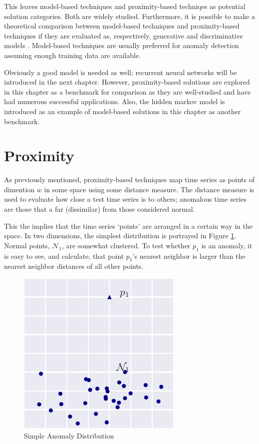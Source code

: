 This leaves model-based techniques and proximity-based techniqes as potential solution categories. Both are widely studied. Furthermore, it is possible to make a theoretical comparison between model-based techniques and proximity-based techniques if they are evaluated as, respectively, generative and discriminative models \cite{Ng2006}. Model-based techniques are usually preferred for anomaly detection \cite{Ngkvist2014} assuming enough training data are available.

Obviously a good model is needed as well; recurrent neural networks will be introduced in the next chapter. However, proximity-based solutions are explored in this chapter as a benchmark for comparison as they are well-studied and have had numerous successful applications. Also, the hidden markov model is introduced as an example of model-based solutions in this chapter as another benchmark.


\section{Proximity}
\label{sec:adproximity}

As previously mentioned, proximity-based techniques map time series as points of dimention $w$ in some space using some distance measure. The distance measure is used to evaluate how close a test time series is to others; anomalous time series are those that a far (dissimilar) from those considered normal.

This the implies that the time series `points' are arranged in a certain way in the space. In two dimensions, the simplest distribution is portrayed in Figure \ref{fig:simple_dist}. Normal points, $\mathcal{N}_1$, are somewhat clustered. To test whether $p_1$ is an anomaly, it is easy to see, and calculate, that point $p_1$'s nearest neighbor is larger than the nearest neighbor distances of all other points.

\begin{figure}[H]
  \centering
  \includegraphics{figs/simple_dist.pdf}
  \caption{Simple Anomaly Distribution}
  \label{fig:simple_dist}
\end{figure}

